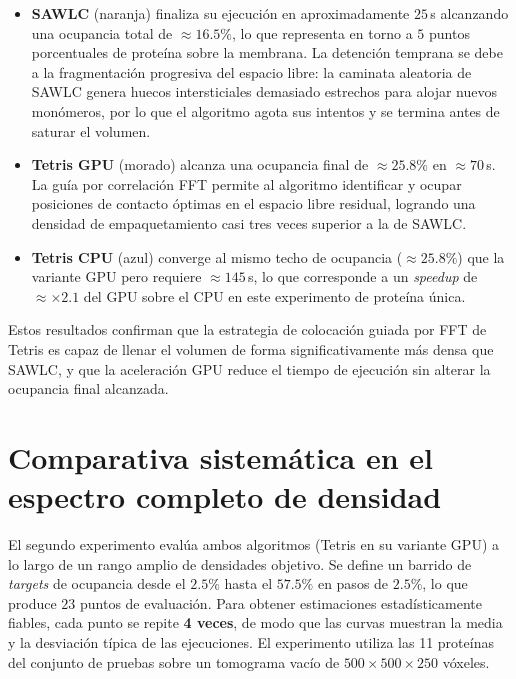 \begin{itemize}
    \item \textbf{SAWLC} (naranja) finaliza su ejecución en aproximadamente $25$\,s alcanzando una
    ocupancia total de $\approx 16.5\%$, lo que representa en torno a $5$ puntos porcentuales de
    proteína sobre la membrana. La detención temprana se debe a la fragmentación progresiva del espacio
    libre: la caminata aleatoria de SAWLC genera huecos intersticiales demasiado estrechos para alojar
    nuevos monómeros, por lo que el algoritmo agota sus intentos y se termina antes de saturar el volumen.

    \item \textbf{Tetris GPU} (morado) alcanza una ocupancia final de $\approx 25.8\%$ en $\approx 70$\,s.
    La guía por correlación FFT permite al algoritmo identificar y ocupar posiciones de contacto óptimas
    en el espacio libre residual, logrando una densidad de empaquetamiento casi tres veces superior a la
    de SAWLC.

    \item \textbf{Tetris CPU} (azul) converge al mismo techo de ocupancia ($\approx 25.8\%$) que la
    variante GPU pero requiere $\approx 145$\,s, lo que corresponde a un \textit{speedup} de $\approx
    \times 2.1$ del GPU sobre el CPU en este experimento de proteína única.
\end{itemize}

Estos resultados confirman que la estrategia de colocación guiada por FFT de Tetris es capaz de llenar
el volumen de forma significativamente más densa que SAWLC, y que la aceleración GPU reduce el tiempo de
ejecución sin alterar la ocupancia final alcanzada.

\section{Comparativa sistemática en el espectro completo de densidad}

El segundo experimento evalúa ambos algoritmos (Tetris en su variante GPU) a lo largo de un rango amplio
de densidades objetivo. Se define un barrido de \textit{targets} de ocupancia desde el $2.5\%$ hasta el
$57.5\%$ en pasos de $2.5\%$, lo que produce $23$ puntos de evaluación. Para obtener estimaciones
estadísticamente fiables, cada punto se repite \textbf{4 veces}, de modo que las curvas muestran la
media y la desviación típica de las ejecuciones. El experimento utiliza las 11 proteínas del conjunto de
pruebas sobre un tomograma vacío de $500 \times 500 \times 250$ vóxeles.

